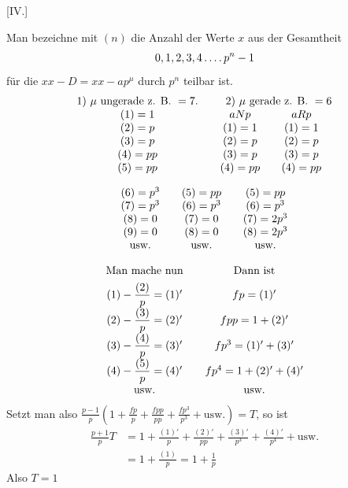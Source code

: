 \par\bigskip{}\centerline{[IV.]}\medskip
Man bezeichne mit $(n)$ die Anzahl der Werte $x$ aus der Gesamtheit
\[
0,1,2,3,4\mathinner{.\,.\,.\,.} p^n-1
\]
für die $xx-D=xx-ap^\mu$ durch $p^n$ teilbar ist.
\[
\begin{array}{c@{\qquad}cc}
1)\ \mu\text{ ungerade z. B. }=7.&\multicolumn2c{2)\ \mu\text{ gerade z. B. }=6}\\
(1)=1&aNp&aRp\\
(2)=p&(1)=1&(1)=1\\
(3)=p&(2)=p&(2)=p\\
(4)=pp&(3)=p&(3)=p\\
(5)=pp&(4)=pp&(4)=pp
\end{array}
\]

\[
\begin{array}{c@{\qquad}c@{\qquad}c}
(6)=p^3&(5)=pp&(5)=pp\\
(7)=p^3&(6)=p^3&(6)=p^3\\
(8)=0&(7)=0&(7)=2p^3\\
(9)=0&(8)=0&(8)=2p^3\\
\text{usw.}&\text{usw.}&\text{usw.}
\end{array}
\]

\[
\begin{array}{c@{\qquad}c}
\text{Man mache nun}&\text{Dann ist}\\[.4em]
(1)-\dfrac{(2)}p=(1)'&fp=(1)'\\[.4em]
(2)-\dfrac{(3)}p=(2)'&fpp=1+(2)'\\[.4em]
(3)-\dfrac{(4)}p=(3)'&fp^3=(1)'+(3)'\\[.4em]
(4)-\dfrac{(5)}p=(4)'&fp^4=1+(2)'+(4)'\\
\text{usw.}&\text{usw.}
\end{array}
\]
Setzt man also $\frac{p-1}p(1+\frac{fp}p+\frac{fpp}{pp}+\frac{fp^3}{p^3}+\text{usw.})=T$, so ist
\[
\begin{aligned}
\frac{p+1}p T&=1+\frac{(1)'}p+\frac{(2)'}{pp}+\frac{(3)'}{p^3}+\frac{(4)'}{p^4}+\text{usw.}\\
&=1+\frac{(1)}p=1+\frac1p
\end{aligned}
\]
Also $T=1$

